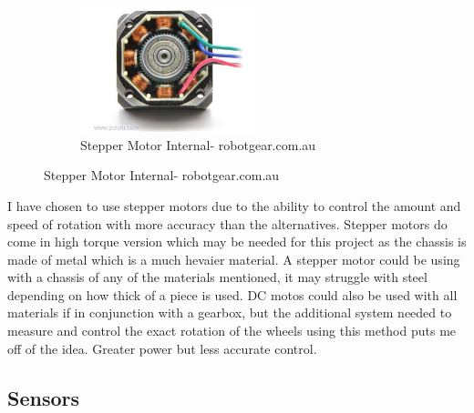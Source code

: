 \begin{itemize}
\begin{figure}[h]
\begin{subfigure}
        \caption{Stepper Motor - stepperonline.com}
        \label{Stepper Motor}
\end{subfigure}
\begin{subfigure}
        \centering
        \includegraphics[width=2.0in] {Images/stepper-internal.jpg}
        \caption{Stepper Motor Internal- robotgear.com.au}
        \label{Stepper Motor Internal}
\end{subfigure}
\end{figure}
\end{itemize}

I have chosen to use stepper motors due to the ability to control the amount and speed of rotation with more accuracy than the alternatives.  Stepper motors do come in high torque version which may be needed for this project as the chassis is made of metal which is a much hevaier material.  A stepper motor could be using with a chassis of any of the materials mentioned, it may struggle with steel depending on how thick of a piece is used.  DC motos could also be used with all materials if in conjunction with a gearbox, but the additional system needed to measure and control the exact rotation of the wheels using this method puts me off of the idea.  Greater power but less accurate control.

\subsection{Sensors}

